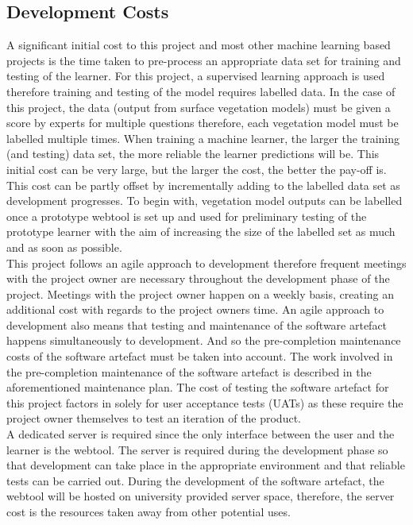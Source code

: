 \documentclass{ecmm427_assignment}
\begin{document}
\subsection{Development Costs}
\quad A significant initial cost to this project and most other machine learning based projects is the time taken to pre-process an appropriate data set for training and testing of the learner. For this project, a supervised learning approach is used therefore training and testing of the model requires labelled data. In the case of this project, the data (output from surface vegetation models) must be given a score by experts for multiple questions therefore, each vegetation model must be labelled multiple times. When training a machine learner, the larger the training (and testing) data set, the more reliable the learner predictions will be. This initial cost can be very large, but the larger the cost, the better the pay-off is. This cost can be partly offset by incrementally adding to the labelled data set as development progresses. To begin with, vegetation model outputs can be labelled once a prototype webtool is set up and used for preliminary testing of the prototype learner with the aim of increasing the size of the labelled set as much and as soon as possible.\\

\quad This project follows an agile approach to development therefore frequent meetings with the project owner are necessary throughout the development phase of the project. Meetings with the project owner happen on a weekly basis, creating an additional cost with regards to the project owners time. An agile approach to development also means that testing and maintenance of the software artefact happens simultaneously to development. And so the pre-completion maintenance costs of the software artefact must be taken into account. The work involved in the pre-completion maintenance of the software artefact is described in the aforementioned maintenance plan. The cost of testing the software artefact for this project factors in solely for user acceptance tests (UATs) as these require the project owner themselves to test an iteration of the product.\\

\quad A dedicated server is required since the only interface between the user and the learner is the webtool. The server is required during the development phase so that development can take place in the appropriate environment and that reliable tests can be carried out. During the development of the software artefact, the webtool will be hosted on university provided server space, therefore, the server cost is the resources taken away from other potential uses.\\
\end{document}
